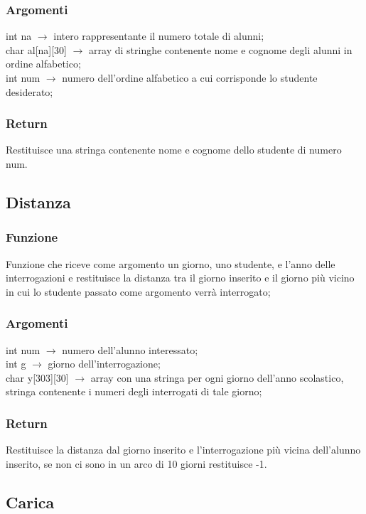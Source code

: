 \documentclass[14pt]{extarticle}
\begin{document}
\subsubsection*{Argomenti}
int na $\longrightarrow$ intero rappresentante il numero totale di alunni; 
\\char al[na][30] $\longrightarrow$ array di stringhe contenente nome e cognome degli alunni in ordine alfabetico;
\\int num $\longrightarrow$ numero dell'ordine alfabetico a cui corrisponde lo studente desiderato;
\subsubsection*{Return}
Restituisce una stringa contenente nome e cognome dello studente di numero num.
\vspace{50px}
\subsection{Distanza}
\subsubsection*{Funzione}
 Funzione che riceve come argomento un giorno, uno studente, e l'anno delle interrogazioni e restituisce la distanza tra il giorno inserito e il giorno più vicino in cui lo studente passato come argomento verrà interrogato;
\subsubsection*{Argomenti}
int num $\longrightarrow$ numero dell'alunno interessato;
\\int g $\longrightarrow$ giorno dell'interrogazione;
\\char y[303][30] $\longrightarrow$ array con una stringa per ogni giorno dell'anno scolastico, stringa contenente i numeri degli interrogati di tale giorno;
\subsubsection*{Return}
 Restituisce la distanza dal giorno inserito e l'interrogazione più vicina dell'alunno inserito, se non ci sono in un arco di 10 giorni restituisce -1.
\vspace{50px}
\subsection{Carica}
\end{document}
